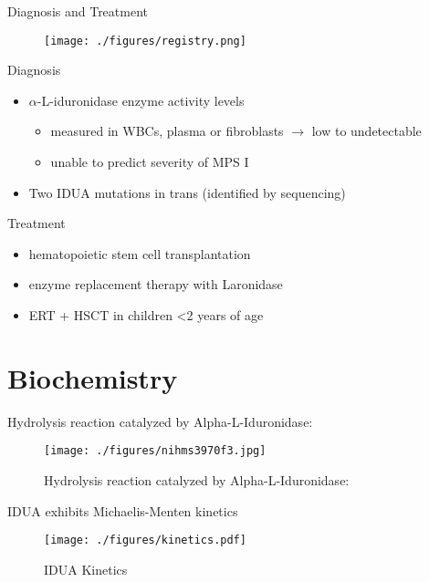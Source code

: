 \documentclass[presentation, smaller]{beamer}
\begin{document}
\begin{frame}[label={sec:orgheadline3}]{Diagnosis and Treatment}
\begin{figure}[htb]
\centering
\texttt{[image: ./figures/registry.png]}
\label{fig:reg}
\end{figure}


\begin{block}{Diagnosis}
\begin{itemize}
\item \(\alpha\)-L-iduronidase enzyme activity levels
\begin{itemize}
\item measured in WBCs, plasma or fibroblasts \(\to\) low to undetectable
\item unable to predict severity of MPS I
\end{itemize}
\item Two ​IDUA mutations in trans (identified by sequencing)
\end{itemize}
\end{block}

\begin{block}{Treatment}
\begin{itemize}
\item hematopoietic stem cell transplantation
\item enzyme replacement therapy with Laronidase
\item ERT + HSCT in children <2 years of age
\end{itemize}
\end{block}
\end{frame}


\section{Biochemistry}
\label{sec:orgheadline8}
\begin{frame}[label={sec:orgheadline5}]{Hydrolysis reaction catalyzed by Alpha-L-Iduronidase:}
\begin{figure}[htb]
\centering
\texttt{[image: ./figures/nihms3970f3.jpg]}
\caption[mech]{\label{fig:mech}
Hydrolysis reaction catalyzed by Alpha-L-Iduronidase:}
\end{figure}
\end{frame}

\begin{frame}[label={sec:orgheadline6}]{IDUA exhibits Michaelis-Menten kinetics}
\begin{figure}[htb]
\centering
\texttt{[image: ./figures/kinetics.pdf]}
\caption{\label{fig:mm}
IDUA Kinetics}
\end{figure}
\end{frame}
\end{document}
